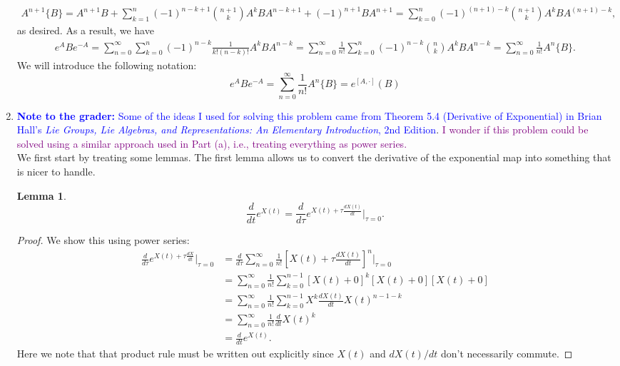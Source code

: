 \documentclass{article}
\theoremstyle{definition}
\newtheorem{lemma}{Lemma}
\newcommand{\f}[2]{\frac{#1}{#2}}
\newcommand{\lb}{\left[}
\newcommand{\rb}{\right]}
\begin{document}
\begin{enumerate}[label=(\alph*)]
\begin{align*}
	A^{n+1}\{B\} 
	= A^{n+1}B + \sum^{n}_{k=1} (-1)^{n-k+1} {{n+1}\choose{k}} A^{k} B A^{n-k+1} + (-1)^{n+1} B A^{n+1} 
	= \sum^{n}_{k=0} (-1)^{(n+1)-k} {{n+1}\choose {k}} A^k B A^{(n+1)-k},
	\end{align*}
	as desired. As a result, we have 
	\begin{align*}
	e^A B e^{-A} 
	= \sum^\infty_{n=0} \sum^n_{k=0} (-1)^{n-k}\f{1}{k!(n-k)!}A^k B A^{n-k}
	= \sum^\infty_{n=0} \f{1}{n!} \sum^n_{k=0} (-1)^{n-k}{n\choose k}A^k B A^{n-k}
	= \sum^\infty_{n=0} \f{1}{n!} A^n\{B\}.
	\end{align*}
	We will introduce the following notation:
	\begin{equation*}
	e^A B e^{-A} = \sum^\infty_{n=0} \f{1}{n!} A^n\{B\} = e^{[A,\cdot]}(B)
	\end{equation*}

	
	
	\item \textcolor{blue}{\textbf{Note to the grader:} Some of the ideas I used for solving this problem came from Theorem 5.4 (Derivative of Exponential) in Brian Hall's \textit{Lie Groups, Lie Algebras, and Representations: An Elementary Introduction}, 2nd Edition}. \textcolor{purple}{I wonder if this problem could be solved using a similar approach used in Part (a), i.e., treating everything as power series.}\\
	
	We first start by treating some lemmas. The first lemma allows us to convert the derivative of the exponential map into something that is nicer to handle.
	
	\begin{lemma}\label{lem:1}
	\begin{equation*}
	\f{d}{dt} e^{X(t)} = \f{d}{d\tau} e^{X(t) + \tau \f{dX(t)}{dt}} \bigg\vert_{\tau = 0}.
	\end{equation*}
	\end{lemma}
	\begin{proof}
		We show this using power series:
		\begin{align*}
		\f{d}{d\tau} e^{X(t) + \tau \f{dX}{dt}} \bigg\vert_{\tau = 0} 
		&= \f{d}{d\tau}\sum^\infty_{n=0} \f{1}{n!} \lb X(t) + \tau \f{dX(t)}{dt} \rb^n \bigg\vert_{\tau=0}\\
		&= \sum^\infty_{n=0} \f{1}{n!} \sum^{n-1}_{k=0} \lb X(t) + 0   \rb^k \lb X(t) + 0  \rb \lb X(t) + 0  \rb\\
		&= \sum^\infty_{n=0} \f{1}{n!} \sum^{n-1}_{k=0}X^k \f{dX(t)}{dt} X(t)^{n-1-k}\\
		&= \sum^\infty_{n=0} \f{1}{n!} \f{d}{dt} X(t)^k \\
		&= \f{d}{dt} e^{X(t)}.
		\end{align*}
		Here we note that that product rule must be written out explicitly since $X(t)$ and $dX(t)/dt$ don't necessarily commute. 
	\end{proof}


\end{enumerate}
\end{document}
